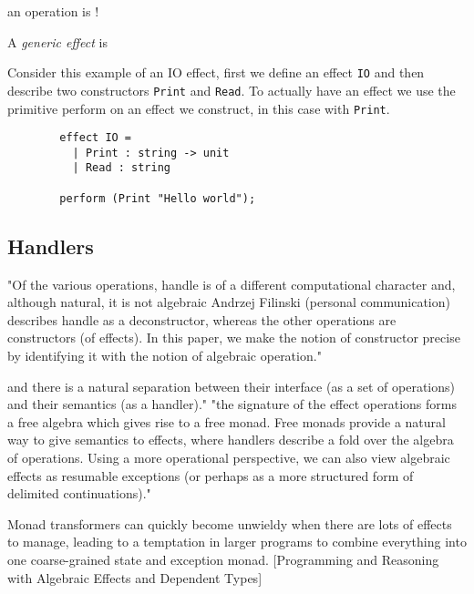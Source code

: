 \begin{definition}
    an operation is !
\end{definition}

\begin{definition}
    A \textit{generic effect} is
\end{definition}

\begin{example}
    Consider this example of an IO effect,
    first we define an effect \texttt{IO}
    and then describe two constructors
    \texttt{Print} and \texttt{Read}.
    To actually have an effect we use the primitive
    perform on an effect we construct, in this case with \texttt{Print}.
    \begin{verbatim}
        effect IO =
          | Print : string -> unit
          | Read : string

        perform (Print "Hello world");
    \end{verbatim}
\end{example}

\subsection{Handlers}
"Of the various operations, handle is of a different computational character and, although natural, it is not algebraic
Andrzej Filinski (personal communication) describes handle as a deconstructor, whereas the other operations are constructors (of effects). In this paper, we make the notion of constructor precise by identifying it with the notion of algebraic operation."





\cite{Plotkin:2002dw}





and there is a natural separation between
their interface (as a set of operations)
and
their semantics (as a handler)."
"the signature of the effect operations forms a free algebra which gives rise to a free monad.
Free monads provide a natural way to give semantics to effects,
where handlers describe a fold over the algebra of operations.
Using a more operational perspective,
we can also view algebraic effects as resumable exceptions
(or perhaps as a more structured form of delimited continuations)."
\cite{leijen2017type}

Monad transformers can quickly become unwieldy when there are lots of effects to manage,
leading to a temptation in larger programs to combine everything into one coarse-grained state and exception monad.
[Programming and Reasoning with Algebraic Effects and Dependent Types]

